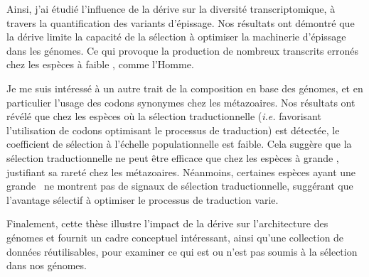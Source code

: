 Ainsi, j'ai étudié l'influence de la dérive sur la diversité transcriptomique, à travers la quantification des variants d'épissage. Nos résultats ont démontré que la dérive limite la capacité de la sélection à optimiser la machinerie d'épissage dans les génomes. Ce qui provoque la production de nombreux transcrits erronés chez les espèces à faible \Ne, comme l'Homme.

Je me suis intéressé à un autre trait de la composition en base des génomes, et en particulier l'usage des codons synonymes chez les métazoaires. Nos résultats ont révélé que chez les espèces où la sélection traductionnelle (\textit{i.e.} favorisant l'utilisation de codons optimisant le processus de traduction) est détectée, le coefficient de sélection à l'échelle populationnelle est faible. Cela suggère que la sélection traductionnelle ne peut être efficace que chez les espèces à grande \Ne, justifiant sa rareté chez les métazoaires. Néanmoins, certaines espèces ayant une grande \Ne~ne montrent pas de signaux de sélection traductionnelle, suggérant que l'avantage sélectif à optimiser le processus de traduction varie.

Finalement, cette thèse illustre l'impact de la dérive sur l'architecture des génomes et fournit un cadre conceptuel intéressant, ainsi qu'une collection de données réutilisables, pour examiner ce qui est ou n'est pas soumis à la sélection dans nos génomes.